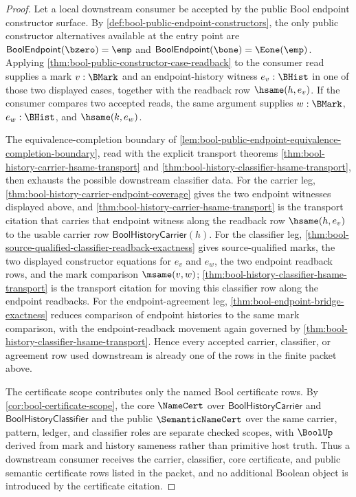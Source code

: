 \begin{proof}
Let a local downstream consumer be accepted by the public Bool endpoint constructor surface. By \autoref{def:bool-public-endpoint-constructors}, the only public constructor alternatives available at the entry point are
$\mathsf{BoolEndpoint}(\bzero)=\emp$ and
$\mathsf{BoolEndpoint}(\bone)=\Eone(\emp)$. Applying \autoref{thm:bool-public-constructor-case-readback} to the consumer read supplies a mark $v:\BMark$ and an endpoint-history witness $e_v:\BHist$ in one of those two displayed cases, together with the readback row $\hsame(h,e_v)$. If the consumer compares two accepted reads, the same argument supplies $w:\BMark$, $e_w:\BHist$, and $\hsame(k,e_w)$.

The equivalence-completion boundary of \autoref{lem:bool-public-endpoint-equivalence-completion-boundary}, read with the explicit transport theorems \autoref{thm:bool-history-carrier-hsame-transport} and \autoref{thm:bool-history-classifier-hsame-transport}, then exhausts the possible downstream classifier data. For the carrier leg, \autoref{thm:bool-history-carrier-endpoint-coverage} gives the two endpoint witnesses displayed above, and \autoref{thm:bool-history-carrier-hsame-transport} is the transport citation that carries that endpoint witness along the readback row $\hsame(h,e_v)$ to the usable carrier row $\mathsf{BoolHistoryCarrier}(h)$. For the classifier leg, \autoref{thm:bool-source-qualified-classifier-readback-exactness} gives source-qualified marks, the two displayed constructor equations for $e_v$ and $e_w$, the two endpoint readback rows, and the mark comparison $\msame(v,w)$; \autoref{thm:bool-history-classifier-hsame-transport} is the transport citation for moving this classifier row along the endpoint readbacks. For the endpoint-agreement leg, \autoref{thm:bool-endpoint-bridge-exactness} reduces comparison of endpoint histories to the same mark comparison, with the endpoint-readback movement again governed by \autoref{thm:bool-history-classifier-hsame-transport}. Hence every accepted carrier, classifier, or agreement row used downstream is already one of the rows in the finite packet above.

The certificate scope contributes only the named Bool certificate rows. By \autoref{cor:bool-certificate-scope}, the core $\NameCert$ over $\mathsf{BoolHistoryCarrier}$ and $\mathsf{BoolHistoryClassifier}$ and the public $\SemanticNameCert$ over the same carrier, pattern, ledger, and classifier roles are separate checked scopes, with $\BoolUp$ derived from mark and history sameness rather than primitive host truth. Thus a downstream consumer receives the carrier, classifier, core certificate, and public semantic certificate rows listed in the packet, and no additional Boolean object is introduced by the certificate citation.


\end{proof}

